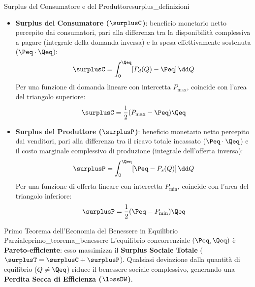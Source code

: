 \begin{definizione}{Surplus del Consumatore e del Produttore}{surplus_definizioni}
\begin{itemize}
    \item \textbf{Surplus del Consumatore ($\surplusC$)}: beneficio monetario netto percepito dai consumatori, pari alla differenza tra la disponibilità complessiva a pagare (integrale della domanda inversa) e la spesa effettivamente sostenuta ($\Peq \cdot \Qeq$):
    \begin{equation}
        \surplusC = \int_0^{\Qeq} [ P_d(Q) - \Peq ] \, \dd Q
    \end{equation}
    Per una funzione di domanda lineare con intercetta $P_{\max}$, coincide con l'area del triangolo superiore:
    \begin{equation}
        \surplusC = \frac{1}{2} (P_{\max} - \Peq) \Qeq
    \end{equation}
    
    \item \textbf{Surplus del Produttore ($\surplusP$)}: beneficio monetario netto percepito dai venditori, pari alla differenza tra il ricavo totale incassato ($\Peq \cdot \Qeq$) e il costo marginale complessivo di produzione (integrale dell'offerta inversa):
    \begin{equation}
        \surplusP = \int_0^{\Qeq} [ \Peq - P_s(Q) ] \, \dd Q
    \end{equation}
    Per una funzione di offerta lineare con intercetta $P_{\min}$, coincide con l'area del triangolo inferiore:
    \begin{equation}
        \surplusP = \frac{1}{2} (\Peq - P_{\min}) \Qeq
    \end{equation}
\end{itemize}
\end{definizione}

\begin{teorema}{Primo Teorema dell'Economia del Benessere in Equilibrio Parziale}{primo_teorema_benessere}
L'equilibrio concorrenziale $(\Peq, \Qeq)$ è \textbf{Pareto-efficiente}: esso massimizza il \textbf{Surplus Sociale Totale} ($\surplusT = \surplusC + \surplusP$).
Qualsiasi deviazione dalla quantità di equilibrio ($Q \neq \Qeq$) riduce il benessere sociale complessivo, generando una \textbf{Perdita Secca di Efficienza ($\lossDW$)}.
\end{teorema}

